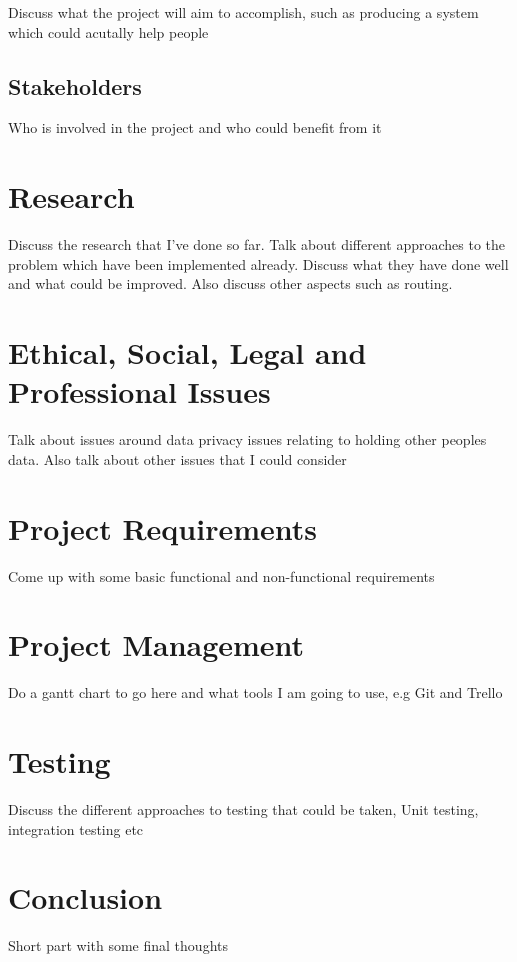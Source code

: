 \documentclass{report}
\begin{document}
Discuss what the project will aim to accomplish, such as producing a system which could acutally help people

\section{Stakeholders}

Who is involved in the project and who could benefit from it

\chapter{Research}

Discuss the research that I've done so far. Talk about different approaches to the 
problem which have been implemented already. Discuss what they have done well and what 
could be improved. Also discuss other aspects such as routing.

\chapter{Ethical, Social, Legal and Professional Issues}

Talk about issues around data privacy issues relating to holding other peoples data. 
Also talk about other issues that I could consider

\chapter{Project Requirements}

Come up with some basic functional and non-functional requirements

\chapter{Project Management}

Do a gantt chart to go here and what tools I am going to use, e.g Git and Trello

\chapter{Testing}

Discuss the different approaches to testing that could be taken, Unit testing, integration testing etc

\chapter{Conclusion}

Short part with some final thoughts


{}

\end{document}
